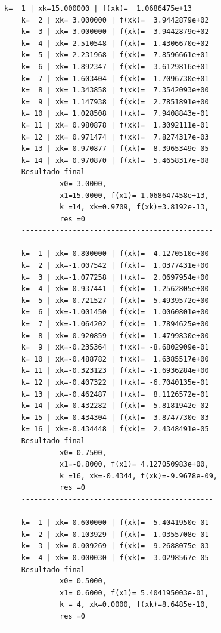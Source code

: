 \documentclass[11pt]{article}
\begin{document}
\begin{multicols}{2}\tiny
		\begin{Verbatim}[commandchars=\\\{\}]
	k=  1 | xk=15.000000 | f(xk)=  1.0686475e+13
	k=  2 | xk= 3.000000 | f(xk)=  3.9442879e+02
	k=  3 | xk= 3.000000 | f(xk)=  3.9442879e+02
	k=  4 | xk= 2.510548 | f(xk)=  1.4306670e+02
	k=  5 | xk= 2.231968 | f(xk)=  7.8596661e+01
	k=  6 | xk= 1.892347 | f(xk)=  3.6129816e+01
	k=  7 | xk= 1.603404 | f(xk)=  1.7096730e+01
	k=  8 | xk= 1.343858 | f(xk)=  7.3542093e+00
	k=  9 | xk= 1.147938 | f(xk)=  2.7851891e+00
	k= 10 | xk= 1.028508 | f(xk)=  7.9408843e-01
	k= 11 | xk= 0.980878 | f(xk)=  1.3092111e-01
	k= 12 | xk= 0.971474 | f(xk)=  7.8274317e-03
	k= 13 | xk= 0.970877 | f(xk)=  8.3965349e-05
	k= 14 | xk= 0.970870 | f(xk)=  5.4658317e-08
	Resultado final
		     x0= 3.0000,
		     x1=15.0000, f(x1)= 1.068647458e+13,
		     k =14, xk=0.9709, f(xk)=3.8192e-13,
		     res =0
	---------------------------------------------

	k=  1 | xk=-0.800000 | f(xk)=  4.1270510e+00
	k=  2 | xk=-1.007542 | f(xk)=  1.0377431e+00
	k=  3 | xk=-1.077258 | f(xk)=  2.0697954e+00
	k=  4 | xk=-0.937441 | f(xk)=  1.2562805e+00
	k=  5 | xk=-0.721527 | f(xk)=  5.4939572e+00
	k=  6 | xk=-1.001450 | f(xk)=  1.0060801e+00
	k=  7 | xk=-1.064202 | f(xk)=  1.7894625e+00
	k=  8 | xk=-0.920859 | f(xk)=  1.4799830e+00
	k=  9 | xk=-0.235364 | f(xk)= -8.6802909e-01
	k= 10 | xk=-0.488782 | f(xk)=  1.6385517e+00
	k= 11 | xk=-0.323123 | f(xk)= -1.6936284e+00
	k= 12 | xk=-0.407322 | f(xk)= -6.7040135e-01
	k= 13 | xk=-0.462487 | f(xk)=  8.1126572e-01
	k= 14 | xk=-0.432282 | f(xk)= -5.8181942e-02
	k= 15 | xk=-0.434304 | f(xk)= -3.8747730e-03
	k= 16 | xk=-0.434448 | f(xk)=  2.4348491e-05
	Resultado final
		     x0=-0.7500,
		     x1=-0.8000, f(x1)= 4.127050983e+00,
		     k =16, xk=-0.4344, f(xk)=-9.9678e-09,
		     res =0
	---------------------------------------------

	k=  1 | xk= 0.600000 | f(xk)=  5.4041950e-01
	k=  2 | xk=-0.103929 | f(xk)= -1.0355708e-01
	k=  3 | xk= 0.009269 | f(xk)=  9.2688075e-03
	k=  4 | xk=-0.000030 | f(xk)= -3.0298567e-05
	Resultado final
		     x0= 0.5000,
		     x1= 0.6000, f(x1)= 5.404195003e-01,
		     k = 4, xk=0.0000, f(xk)=8.6485e-10,
		     res =0
	---------------------------------------------


\end{Verbatim}
\end{multicols}
\end{document}
